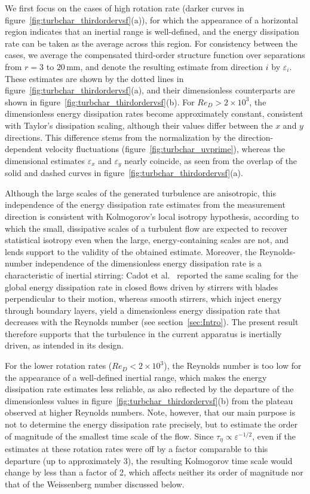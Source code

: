 \documentclass[aps,prfluids,groupedaddress,showkeys,11pt,tightenlines]{revtex4-2}
\begin{document}
We first focus on the cases of high rotation rate (darker curves in figure~\ref{fig:turbchar_thirdordervsf}(a)), for which the appearance of a horizontal region indicates that an inertial range is well-defined, and the energy dissipation rate can be taken as the average across this region. For consistency between the cases, we average the compensated third-order structure function over separations from $r=3$ to $20$\,mm, and denote the resulting estimate from direction $i$ by $\varepsilon_i$. These estimates are shown by the dotted lines in figure~\ref{fig:turbchar_thirdordervsf}(a), and their dimensionless counterparts are shown in figure~\ref{fig:turbchar_thirdordervsf}(b). For $Re_D>2\times10^{3}$, the dimensionless energy dissipation rates become approximately constant, consistent with Taylor's dissipation scaling, although their values differ between the $x$ and $y$ directions. This difference stems from the normalization by the direction-dependent velocity fluctuations (figure~\ref{fig:turbchar_uvprime}), whereas the dimensional estimates $\varepsilon_x$ and $\varepsilon_y$ nearly coincide, as seen from the overlap of the solid and dashed curves in figure~\ref{fig:turbchar_thirdordervsf}(a). 

Although the large scales of the generated turbulence are anisotropic, this independence of the energy dissipation rate estimates from the measurement direction is consistent with Kolmogorov's local isotropy hypothesis, according to which the small, dissipative scales of a turbulent flow are expected to recover statistical isotropy even when the large, energy-containing scales are not, and lends support to the validity of the obtained estimate. Moreover, the Reynolds-number independence of the dimensionless energy dissipation rate is a characteristic of inertial stirring: Cadot et al.~\cite{cadot1997energy} reported the same scaling for the global energy dissipation rate in closed flows driven by stirrers with blades perpendicular to their motion, whereas smooth stirrers, which inject energy through boundary layers, yield a dimensionless energy dissipation rate that decreases with the Reynolds number (see section~\ref{sec:Intro}). The present result therefore supports that the turbulence in the current apparatus is inertially driven, as intended in its design.

For the lower rotation rates ($Re_D<2\times10^{3}$), the Reynolds number is too low for the appearance of a well-defined inertial range, which makes the energy dissipation rate estimates less reliable, as also reflected by the departure of the dimensionless values in figure~\ref{fig:turbchar_thirdordervsf}(b) from the plateau observed at higher Reynolds numbers. Note, however, that our main purpose is not to determine the energy dissipation rate precisely, but to estimate the order of magnitude of the smallest time scale of the flow. Since $\tau_\eta\propto\varepsilon^{-1/2}$, even if the estimates at these rotation rates were off by a factor comparable to this departure (up to approximately 3), the resulting Kolmogorov time scale would change by less than a factor of 2, which affects neither its order of magnitude nor that of the Weissenberg number discussed below.
\end{document}

